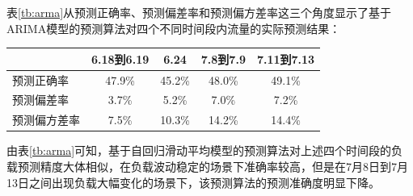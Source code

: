 表\ref{tb:arma}从预测正确率、预测偏差率和预测偏方差率这三个角度显示了基于ARIMA模型的预测算法对四个不同时间段内流量的实际预测结果：
\begin{table}[h]
\centering
{}
\begin{tabular}{@{}lcccc@{}}\toprule
  & 6.18到6.19 & 6.24 & 7.8到7.9 & 7.11到7.13 \\ \midrule
 预测正确率 & 47.9\% & 45.2\% & 48.0\% & 49.1\% \\
 预测偏差率 & 3.7\% & 5.2\% & 7.0\% & 7.2\% \\
 预测偏方差率 & 7.5\% & 10.3\% & 14.2\% & 14.4\% \\ \bottomrule
\end{tabular}
\end{table}
由表\ref{tb:arma}可知，基于自回归滑动平均模型的预测算法对上述四个时间段的负载预测精度大体相似，在负载波动稳定的场景下准确率较高，但是在7月8日到7月13日之间出现负载大幅变化的场景下，该预测算法的预测准确度明显下降。


